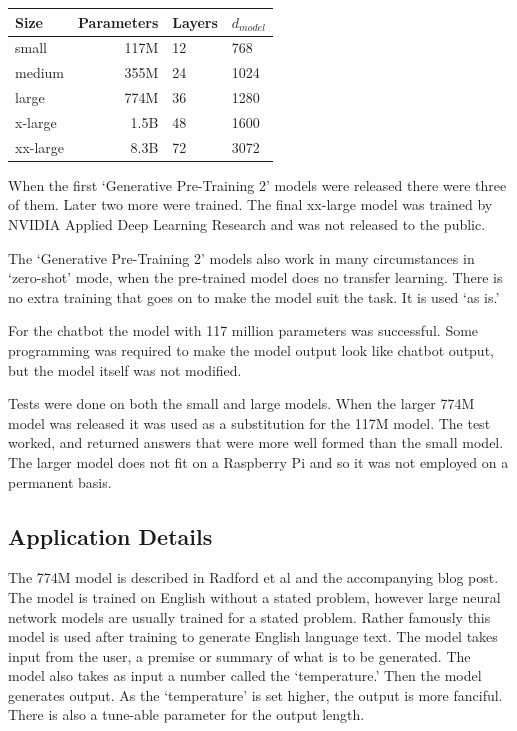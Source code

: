 \begin{center}

\begin{tabular}{lrll}
	Size & Parameters & Layers & $d_{model}$ \\
	\hline
	small & 117M       & 12     & 768          \\
	medium & 355M       & 24     & 1024         \\
	large & 774M       & 36     & 1280         \\
	x-large & 1.5B     & 48     & 1600 \\
	xx-large & 8.3B   &  72 &   3072 
\end{tabular}

	
\end{center}

When the first `Generative Pre-Training 2' models were released there were three of them. Later two more were trained. The final xx-large model was trained by NVIDIA Applied Deep Learning Research \cite{2019NVIDIAadlr} and was not released to the public.

The `Generative Pre-Training 2' models also work in many circumstances in `zero-shot' mode, when the pre-trained model does no transfer learning. There is no extra training that goes on to make the model suit the task. It is used `as is.'

For the chatbot the model with 117 million parameters was successful. Some programming was required to make the model output look like chatbot output, but the model itself was not modified.

Tests were done on both the small and large models. When the larger 774M model was released it was used as a substitution for the 117M model. The test worked, and returned answers that were more well formed than the small model. The larger model does not fit on a Raspberry Pi and so it was not employed on a permanent basis. %

\subsection{Application Details}
The 774M model is described in Radford et al \cite{radford2019language} and the accompanying blog post. The model is trained on English without a stated problem, however large neural network models are usually trained for a stated problem. Rather famously this model is used after training to generate English language text. The model takes input from the user, a premise or summary of what is to be generated. The model also takes as input a number called the `temperature.' Then the model generates output. As the `temperature' is set higher, the output is more fanciful. There is also a tune-able parameter for the output length. 

